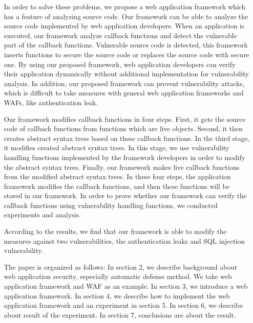 \documentclass[conference]{IEEEtran}
\begin{document}
In order to solve these problems, we propose a web application framework which has a feature of analyzing source code.
Our framework can be able to analyze the source code implemented by web application developers.
When an application is executed, our framework analyze callback functions and detect the vulnerable part of the callback functions.
Vulnerable source code is detected, this framework inserts functions to secure the source code or replaces the source code with secure one.
By using our proposed framework, web application developers can verify their application dynamically without additional implementation for vulnerability analysis.
In addition, our proposed framework can prevent vulnerability attacks, which is difficult to take measures with general web application frameworks and WAFs,  like authentication leak.

Our framework modifies callback functions in four steps.
First, it gets the source code of callback functions from functions which are live objects.
Second, it then creates abstract syntax tress based on these callback functions.
In the third stage, it modifies created abstract syntax trees. In this stage, we use vulnerability handling functions implemented by the framework developers in order to modify the abstract syntax trees.
Finally, our framework makes live callback functions from the modified abstract syntax trees.
In these four steps, the application framework modifies the callback functions, and then these functions will be stored in our framework.
In order to prove whether our framework can verify the callback functions using vulnerability handling functions, we conducted experiments and analysis.

According to the results, we find that our framework is able to modify the measures against two vulnerabilities, the authentication leaks and SQL injection vulnerability.

The paper is organized as follows:
In section 2, we describe background about web application security, especially automatic defense method.
We take web application framework and WAF as an example.
In section 3, we introduce a web application framework.
In section 4, we describe how to implement the web application framework and an experiment in section 5.
In section 6, we describe about result of the experiment.
In section 7, conclusions are about the result.
\end{document}
